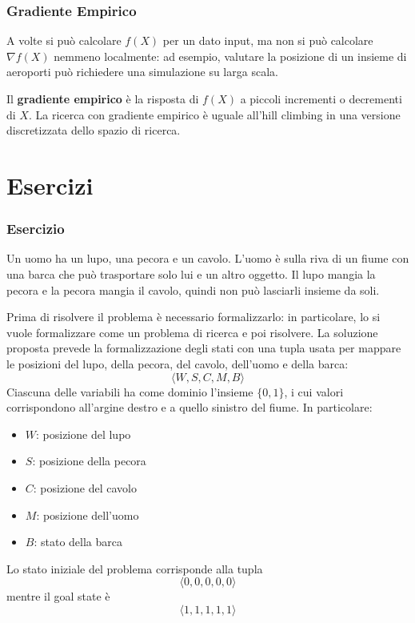 \documentclass[a4paper, 11pt, oneside]{book}
\theoremstyle{definition}
\newcounter{escount}[section]
\newcommand{\esercizio}{
    \needspace{8\baselineskip}%
    \stepcounter{escount}%
    \subsection*{Esercizio \arabic{escount}}%
}
\begin{document}
    \subsection{Gradiente Empirico}
    A volte si pu\`o calcolare $f(X)$ per un dato input, ma non si pu\`o calcolare
    $\nabla f(X)$ nemmeno localmente: ad esempio, valutare la posizione di un insieme di
    aeroporti pu\`o richiedere una simulazione su larga scala.

    Il \textbf{gradiente empirico} \`e la risposta di $f(X)$ a piccoli incrementi o
    decrementi di $X$. La ricerca con gradiente empirico \`e uguale all'hill climbing in una
    versione discretizzata dello spazio di ricerca.


    \chapter{Esercizi}
    \esercizio
    \begin{enunciato}
         Un uomo ha un lupo, una pecora e un cavolo. L'uomo è sulla riva di un fiume 
         con una barca che può trasportare solo lui e un altro oggetto.
         Il lupo mangia la pecora e la pecora mangia il cavolo, quindi non pu\`o
         lasciarli insieme da soli.
    \end{enunciato}

    Prima di risolvere il problema \`e necessario formalizzarlo: in particolare, lo si
    vuole formalizzare come un problema di ricerca e poi risolvere.
    La soluzione proposta prevede la formalizzazione degli stati con una tupla
    usata per mappare le posizioni del lupo, della pecora, del cavolo, dell'uomo e della
    barca:
    \[
        \langle W, S, C, M, B \rangle
    \]
    Ciascuna delle variabili ha come dominio l'insieme $\{0,1\}$, i cui valori
    corrispondono all'argine destro e a quello sinistro del fiume.
    In particolare:
    \begin{itemize}
        \item \( W \): posizione del lupo
        \item \( S \): posizione della pecora
        \item \( C \): posizione del cavolo
        \item \( M \): posizione dell'uomo
        \item \( B \): stato della barca
    \end{itemize}

    Lo stato iniziale del problema corrisponde alla tupla \[ \langle 0, 0, 0, 0, 0 \rangle \]
    mentre il goal state \`e \[ \langle 1, 1, 1, 1, 1 \rangle \]
\end{document}

